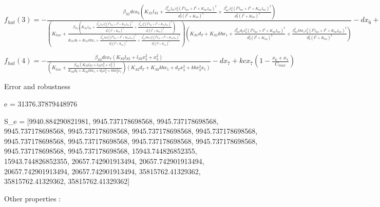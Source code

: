 $f_{hat}(3)=- \frac{\beta_{S1} dc x_{6} \left(K_{S1} l_{S1} + \frac{\beta_{lac}^{2} l_{S1} x_{6}^{2} \left(I^{2} l_{lac} + I^{2} + K_{lac} l_{lac}\right)^{2}}{d_{S}^{2} \left(I^{2} + K_{lac}\right)^{2}} + \frac{\beta_{lac}^{2} x_{6}^{2} \left(I^{2} l_{lac} + I^{2} + K_{lac} l_{lac}\right)^{2}}{d_{S}^{2} \left(I^{2} + K_{lac}\right)^{2}}\right)}{\left(K_{tox} + \frac{\beta_{S1} \left(K_{S1} l_{S1} + \frac{\beta_{lac}^{2} l_{S1} x_{6}^{2} \left(I^{2} l_{lac} + I^{2} + K_{lac} l_{lac}\right)^{2}}{d_{S}^{2} \left(I^{2} + K_{lac}\right)^{2}} + \frac{\beta_{lac}^{2} x_{6}^{2} \left(I^{2} l_{lac} + I^{2} + K_{lac} l_{lac}\right)^{2}}{d_{S}^{2} \left(I^{2} + K_{lac}\right)^{2}}\right)}{K_{S1} d_{T} + K_{S1} kb x_{1} + \frac{\beta_{lac}^{2} d_{T} x_{6}^{2} \left(I^{2} l_{lac} + I^{2} + K_{lac} l_{lac}\right)^{2}}{d_{S}^{2} \left(I^{2} + K_{lac}\right)^{2}} + \frac{\beta_{lac}^{2} kb x_{1} x_{6}^{2} \left(I^{2} l_{lac} + I^{2} + K_{lac} l_{lac}\right)^{2}}{d_{S}^{2} \left(I^{2} + K_{lac}\right)^{2}}}\right) \left(K_{S1} d_{T} + K_{S1} kb x_{1} + \frac{\beta_{lac}^{2} d_{T} x_{6}^{2} \left(I^{2} l_{lac} + I^{2} + K_{lac} l_{lac}\right)^{2}}{d_{S}^{2} \left(I^{2} + K_{lac}\right)^{2}} + \frac{\beta_{lac}^{2} kb x_{1} x_{6}^{2} \left(I^{2} l_{lac} + I^{2} + K_{lac} l_{lac}\right)^{2}}{d_{S}^{2} \left(I^{2} + K_{lac}\right)^{2}}\right)} - d x_{6} + kc x_{6} \left(1 - \frac{x_{6} + x_{7}}{C_{max}}\right)$


$f_{hat}(4)=- \frac{\beta_{S2} dc x_{7} \left(K_{S2} l_{S2} + l_{S2} x_{3}^{2} + x_{3}^{2}\right)}{\left(K_{tox} + \frac{\beta_{S2} \left(K_{S2} l_{S2} + l_{S2} x_{3}^{2} + x_{3}^{2}\right)}{K_{S2} d_{T} + K_{S2} kb x_{5} + d_{T} x_{3}^{2} + kb x_{3}^{2} x_{5}}\right) \left(K_{S2} d_{T} + K_{S2} kb x_{5} + d_{T} x_{3}^{2} + kb x_{3}^{2} x_{5}\right)} - d x_{7} + kc x_{7} \left(1 - \frac{x_{6} + x_{7}}{C_{max}}\right)$



Error and robustness 


e = 31376.37879448976

S_e = [9940.884290821981, 9945.737178698568, 9945.737178698568, 9945.737178698568, 9945.737178698568, 9945.737178698568, 9945.737178698568, 9945.737178698568, 9945.737178698568, 9945.737178698568, 9945.737178698568, 9945.737178698568, 9945.737178698568, 15943.744826852355, 15943.744826852355, 20657.742901913494, 20657.742901913494, 20657.742901913494, 20657.742901913494, 35815762.41329362, 35815762.41329362, 35815762.41329362]

Other properties :


